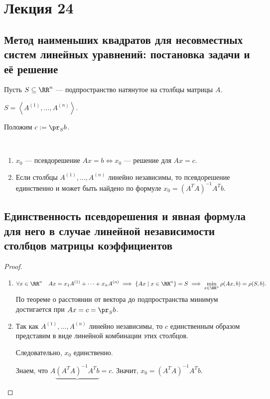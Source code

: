 \section{Лекция 24} 

\subsection{Метод наименьших квадратов для несовместных систем линейных уравнений: постановка задачи и её решение}

Пусть $S \subseteq \RR^n$ --- подпространство натянутое на столбцы матрицы $A$.

$S = \left< A^{(1)}, \dots, A^{(n)} \right>$.

Положим $c := \pr_S b$.

\begin{proposal}~
    \begin{enumerate}
    \item $x_0$ --- псевдорешение $Ax = b \iff x_0$ --- решение для $Ax = c$.  
    \item Если столбцы $A^{(1)}, \dots, A^{(n)}$ линейно независимы, то псевдорешение единственно и может быть найдено по формуле $x_0 = (A^{T} A)^{-1} A^{T} b$.
    \end{enumerate}
\end{proposal}


\subsection{Единственность псевдорешения и явная формула для него в случае линейной независимости столбцов матрицы коэффициентов}

\begin{proof}~
    \begin{enumerate}
        \item
            \begin{equation*}
                \forall x \in \RR^n \quad Ax = x_1 A^{(1)} + \dots + x_n A^{(n)} \implies \{Ax \mid x \in \RR^n\} = S \implies \min_{x \in \RR^n} \rho(Ax, b) = \rho(S, b)
            .\end{equation*}
            По теореме о расстоянии от вектора до подпространства минимум достигается при $Ax = c = \pr_S b$.

        \item
            Так как $A^{(1)}, \dots, A^{(n)}$ линейно независимы, то $c$ единственным образом представим в виде линейной комбинации этих столбцов.

            Следовательно, $x_0$ единственно.

            Знаем, что $A \underbrace{(A^{T} A)^{-1} A^{T} b} = c$. Значит, $x_0 = (A^{T} A)^{-1} A^{T} b$.
            \qedhere
    \end{enumerate}
\end{proof}


